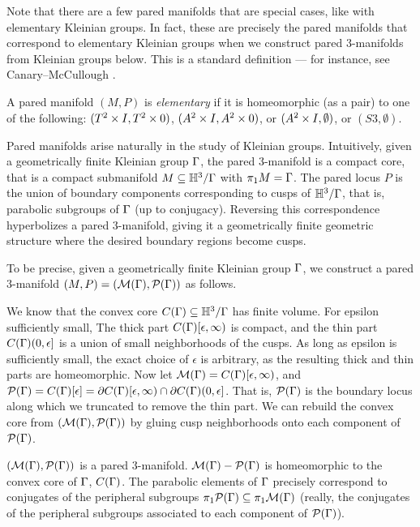 Note that there are a few pared manifolds that are special cases, like with
elementary Kleinian groups. In fact, these are precisely the pared manifolds
that correspond to elementary Kleinian groups when we construct pared
$3$-manifolds from Kleinian groups below. This is a standard definition --- for
instance, see Canary--McCullough \cite[pp88]{CMc}.

\begin{defn}

A pared manifold $(M,P)$ is \emph{elementary} if it is homeomorphic (as a pair)
to one of the following: $(T^2\times I,T^2\times 0)$, $(A^2\times I,A^2\times 0)$, or $(A^2\times
I,\emptyset)$, or $(S3,\emptyset)$.

\end{defn}

Pared manifolds arise naturally in the study of Kleinian groups. Intuitively,
given a geometrically finite Kleinian group $\Gamma$, the pared $3$-manifold is
a compact core, that is a compact submanifold $M \subseteq \mathbb{H}^3/\Gamma$ with $\pi_1M
= \Gamma$.  The pared locus $P$ is the union of boundary components corresponding
to cusps of $\mathbb{H}^3/\Gamma$, that is, parabolic subgroups of $\Gamma$ (up to
conjugacy).  Reversing this correspondence hyperbolizes a pared $3$-manifold,
giving it a geometrically finite geometric structure where the desired boundary
regions become cusps.

To be precise, given a geometrically finite Kleinian group $\Gamma$, we construct
a pared $3$-manifold $(M,P)=(\mathcal{M}(\Gamma),\mathcal{P}(\Gamma))$ as follows.

We know that the convex core $C(\Gamma) \subseteq \mathbb{H}^3/\Gamma$ has finite volume. For
epsilon sufficiently small, The thick part $C(\Gamma)[\epsilon,\infty)$ is
compact, and the thin part $C(\Gamma)(0,\epsilon]$ is a union of small
neighborhoods of the cusps.  As long as epsilon is sufficiently small, the
exact choice of $\epsilon$ is arbitrary, as the resulting thick and thin parts
are homeomorphic.  Now let $\mathcal{M}(\Gamma) = C(\Gamma)[\epsilon,\infty)$, and $\mathcal{P}(\Gamma)
= C(\Gamma)[\epsilon] = \partial C(\Gamma)[\epsilon,\infty) \cap \partial C(\Gamma)(0,\epsilon]$.
That is, $\mathcal{P}(\Gamma)$ is the boundary locus along which we truncated to remove
the thin part. We can rebuild the convex core from $(\mathcal{M}(\Gamma),\mathcal{P}(\Gamma))$ by
gluing cusp neighborhoods onto each component of $\mathcal{P}(\Gamma)$.

\begin{prop}

$(\mathcal{M}(\Gamma),\mathcal{P}(\Gamma))$ is a pared $3$-manifold. $\mathcal{M}(\Gamma)- \mathcal{P}(\Gamma)$ is
homeomorphic to the convex core of $\Gamma$, $C(\Gamma)$. The parabolic elements of
$\Gamma$ precisely correspond to conjugates of the peripheral subgroups
$\pi_1\mathcal{P}(\Gamma) \subseteq \pi_1\mathcal{M}(\Gamma)$ (really, the conjugates of the peripheral
subgroups associated to each component of $\mathcal{P}(\Gamma)$).

\end{prop}

